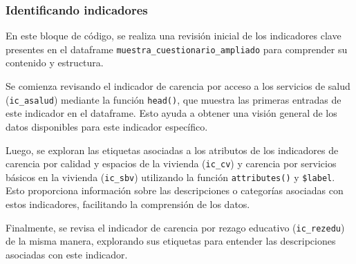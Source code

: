 \documentclass[
  12pt,
]{book}
\newenvironment{Shaded}{\begin{snugshade}}{\end{snugshade}}
\newcommand{\CommentTok}[1]{\textcolor[rgb]{0.56,0.35,0.01}{\textit{#1}}}
\newcommand{\FunctionTok}[1]{\textcolor[rgb]{0.13,0.29,0.53}{\textbf{#1}}}
\newcommand{\NormalTok}[1]{#1}
\newcommand{\SpecialCharTok}[1]{\textcolor[rgb]{0.81,0.36,0.00}{\textbf{#1}}}
\begin{document}
\hypertarget{identificando-indicadores}{%
\subsubsection*{Identificando indicadores}\label{identificando-indicadores}}

En este bloque de código, se realiza una revisión inicial de los indicadores clave presentes en el dataframe \texttt{muestra\_cuestionario\_ampliado} para comprender su contenido y estructura.

Se comienza revisando el indicador de carencia por acceso a los servicios de salud (\texttt{ic\_asalud}) mediante la función \texttt{head()}, que muestra las primeras entradas de este indicador en el dataframe. Esto ayuda a obtener una visión general de los datos disponibles para este indicador específico.

Luego, se exploran las etiquetas asociadas a los atributos de los indicadores de carencia por calidad y espacios de la vivienda (\texttt{ic\_cv}) y carencia por servicios básicos en la vivienda (\texttt{ic\_sbv}) utilizando la función \texttt{attributes()} y \texttt{\$label}. Esto proporciona información sobre las descripciones o categorías asociadas con estos indicadores, facilitando la comprensión de los datos.

Finalmente, se revisa el indicador de carencia por rezago educativo (\texttt{ic\_rezedu}) de la misma manera, explorando sus etiquetas para entender las descripciones asociadas con este indicador.

\begin{Shaded}
\end{Shaded}
\end{document}
